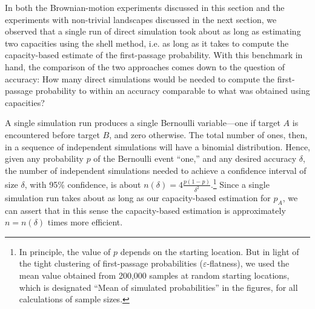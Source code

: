 \documentclass[12pt, nofootinbib,english, amsmath, amssymb, aps, priprint, graphicx,floatfix]{revtex4-1}
\theoremstyle{plain}
\theoremstyle{definition}
\theoremstyle{plain}
\begin{document}
{In both the Brownian-motion experiments discussed in this section and the experiments with non-trivial landscapes discussed in the next section, we observed that a single run of direct simulation took about as long as estimating two capacities using the shell method,
i.e. as long as it takes to compute the capacity-based estimate of the first-passage probability. With this benchmark in hand, the comparison of the two approaches comes down to the question of accuracy: How many direct simulations would be needed to compute the first-passage probability to within an accuracy 
comparable to what was obtained using capacities? 

A single simulation run produces  a single Bernoulli variable---one if target $A$ is encountered before target $B$, and zero otherwise. The total number of ones, then, in a sequence of independent simulations will have a binomial distribution. Hence, given any probability $p$ of the Bernoulli event ``one,''
and any desired accuracy $\delta$, the number of independent simulations needed to achieve a confidence interval of size $\delta$, with 95\% confidence, is
about $n(\delta)=4\frac{p(1-p)}{\delta^2}$.\footnote{
In principle, the value of $p$ depends on the starting location. But in light of the tight clustering of first-passage probabilities ($\varepsilon$-flatness), we used the mean value obtained from 200,000 samples at random starting locations, which is designated ``Mean of simulated probabilities'' in the figures, 
for all calculations of sample sizes.}
Since a single simulation run takes about as long as our capacity-based estimation for $p_A$, we can assert that in this sense the capacity-based estimation is approximately $n=n(\delta)$ times more efficient.

}
\end{document}
